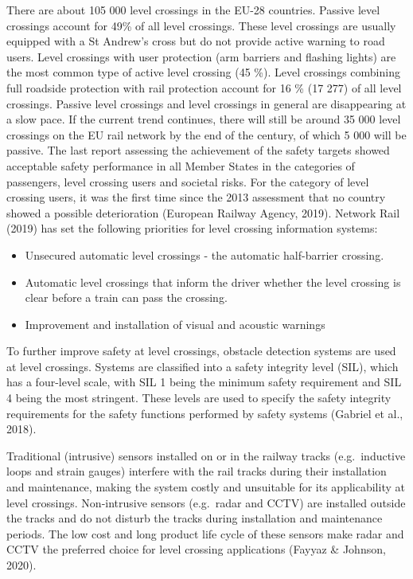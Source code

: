 \documentclass[
]{book}
\providecommand{\tightlist}{%
  \setlength{\itemsep}{0pt}\setlength{\parskip}{0pt}}
\begin{document}
There are about 105 000 level crossings in the EU-28 countries. Passive level crossings account for 49\% of all level crossings. These level crossings are usually equipped with a St Andrew's cross but do not provide active warning to road users. Level crossings with user protection (arm barriers and flashing lights) are the most common type of active level crossing (45 \%). Level crossings combining full roadside protection with rail protection account for 16 \% (17 277) of all level crossings. Passive level crossings and level crossings in general are disappearing at a slow pace. If the current trend continues, there will still be around 35 000 level crossings on the EU rail network by the end of the century, of which 5 000 will be passive. The last report assessing the achievement of the safety targets showed acceptable safety performance in all Member States in the categories of passengers, level crossing users and societal risks. For the category of level crossing users, it was the first time since the 2013 assessment that no country showed a possible deterioration (European Railway Agency, 2019). Network Rail (2019) has set the following priorities for level crossing information systems:

\begin{itemize}
\tightlist
\item
  Unsecured automatic level crossings - the automatic half-barrier crossing.
\item
  Automatic level crossings that inform the driver whether the level crossing is clear before a train can pass the crossing.
\item
  Improvement and installation of visual and acoustic warnings
\end{itemize}

To further improve safety at level crossings, obstacle detection systems are used at level crossings. Systems are classified into a safety integrity level (SIL), which has a four-level scale, with SIL 1 being the minimum safety requirement and SIL 4 being the most stringent. These levels are used to specify the safety integrity requirements for the safety functions performed by safety systems (Gabriel et al., 2018).

Traditional (intrusive) sensors installed on or in the railway tracks (e.g.~inductive loops and strain gauges) interfere with the rail tracks during their installation and maintenance, making the system costly and unsuitable for its applicability at level crossings. Non-intrusive sensors (e.g.~radar and CCTV) are installed outside the tracks and do not disturb the tracks during installation and maintenance periods. The low cost and long product life cycle of these sensors make radar and CCTV the preferred choice for level crossing applications (Fayyaz \& Johnson, 2020).
\end{document}
